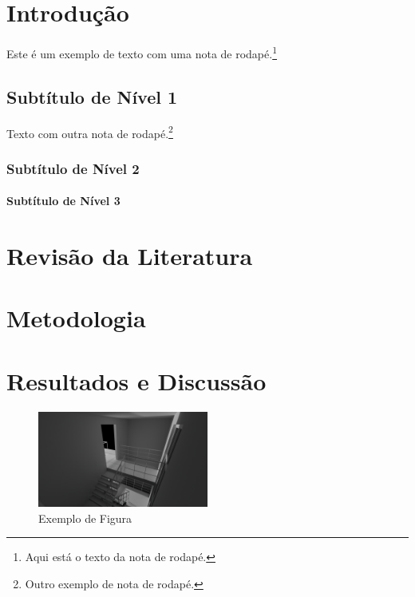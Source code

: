\documentclass[12pt,a4paper,oneside,brazil]{abntex2}
\begin{document}
\tableofcontents
\listoffigures   %
\listoftables    %

\textual

\chapter{Introdução}
Este é um exemplo de texto com uma nota de rodapé.\footnote{Aqui está o texto da nota de rodapé.} \lipsum[1]

\section{Subtítulo de Nível 1}
Texto com outra nota de rodapé.\footnote{Outro exemplo de nota de rodapé.} \lipsum[2-3]

\subsection{Subtítulo de Nível 2}
\lipsum[4]
\subsubsection{Subtítulo de Nível 3}
\lipsum[5]

\chapter{Revisão da Literatura}
\lipsum[6-7]

\chapter{Metodologia}
\lipsum[8-9]

\chapter{Resultados e Discussão}
\lipsum[10]

\begin{figure}[ht]
\centering
\includegraphics[width=0.5\textwidth]{./src/assets/untitled.png}
\caption{Exemplo de Figura}
\label{fig:exemplo}
\end{figure}
\end{document}
